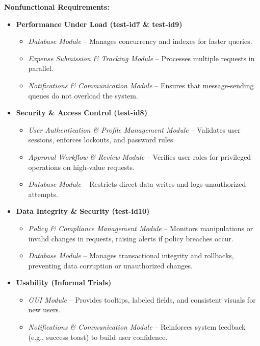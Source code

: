 \documentclass[12pt, titlepage]{article}
\begin{document}
\textbf{Nonfunctional Requirements:}
\begin{itemize}
  \item \textbf{Performance Under Load (test-id7 \& test-id9)}
    \begin{itemize}
      \item \emph{Database Module} – Manages concurrency and indexes for faster queries.
      \item \emph{Expense Submission \& Tracking Module} – Processes multiple requests in parallel.
      \item \emph{Notifications \& Communication Module} – Ensures that message-sending queues do not overload the system.
    \end{itemize}

  \item \textbf{Security \& Access Control (test-id8)}
    \begin{itemize}
      \item \emph{User Authentication \& Profile Management Module} – Validates user sessions, enforces lockouts, and password rules.
      \item \emph{Approval Workflow \& Review Module} – Verifies user roles for privileged operations on high-value requests.
      \item \emph{Database Module} – Restricts direct data writes and logs unauthorized attempts.
    \end{itemize}

  \item \textbf{Data Integrity \& Security (test-id10)}
    \begin{itemize}
      \item \emph{Policy \& Compliance Management Module} – Monitors manipulations or invalid changes in requests, raising alerts if policy breaches occur.
      \item \emph{Database Module} – Manages transactional integrity and rollbacks, preventing data corruption or unauthorized changes.
    \end{itemize}

  \item \textbf{Usability (Informal Trials)}
    \begin{itemize}
      \item \emph{GUI Module} – Provides tooltips, labeled fields, and consistent visuals for new users.
      \item \emph{Notifications \& Communication Module} – Reinforces system feedback (e.g., success toast) to build user confidence.
    \end{itemize}
\end{itemize}
\end{document}
